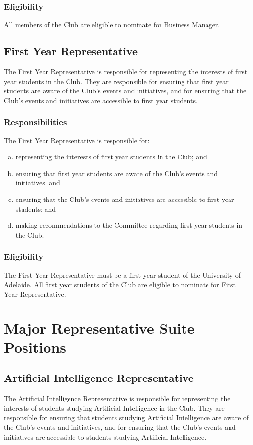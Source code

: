 \documentclass[11pt]{report}
\begin{document}
\subsection{Eligibility}
All members of the Club are eligible to nominate for Business Manager.

\section{First Year Representative}
The First Year Representative is responsible for representing the interests of first year students in the Club. They are responsible for ensuring that first year students are aware of the Club's events and initiatives, and for ensuring that the Club's events and initiatives are accessible to first year students.
\subsection{Responsibilities}
The First Year Representative is responsible for:
\begin{enumerate}[(a)]
    \item representing the interests of first year students in the Club; and
    \item ensuring that first year students are aware of the Club's events and initiatives; and
    \item ensuring that the Club's events and initiatives are accessible to first year students; and
    \item making recommendations to the Committee regarding first year students in the Club.
\end{enumerate}
\subsection{Eligibility}
The First Year Representative must be a first year student of the University of Adelaide. All first year students of the Club are eligible to nominate for First Year Representative.

\chapter{Major Representative Suite Positions}
\section{Artificial Intelligence Representative}
The Artificial Intelligence Representative is responsible for representing the interests of students studying Artificial Intelligence in the Club. They are responsible for ensuring that students studying Artificial Intelligence are aware of the Club's events and initiatives, and for ensuring that the Club's events and initiatives are accessible to students studying Artificial Intelligence.
\end{document}
